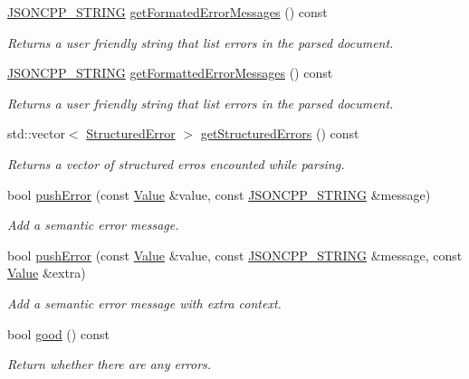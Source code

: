 \begin{DoxyCompactItemize}
\hyperlink{json_8h_a1e723f95759de062585bc4a8fd3fa4be}{J\+S\+O\+N\+C\+P\+P\+\_\+\+S\+T\+R\+I\+NG} \hyperlink{class_json_1_1_reader_a791cbc5afd1bef1631e07239dc452c79}{get\+Formated\+Error\+Messages} () const
\begin{DoxyCompactList}\small\item\em Returns a user friendly string that list errors in the parsed document. \end{DoxyCompactList}\item 
\hyperlink{json_8h_a1e723f95759de062585bc4a8fd3fa4be}{J\+S\+O\+N\+C\+P\+P\+\_\+\+S\+T\+R\+I\+NG} \hyperlink{class_json_1_1_reader_ae638a7b1f36f7ccf99ba89fa36ccf222}{get\+Formatted\+Error\+Messages} () const
\begin{DoxyCompactList}\small\item\em Returns a user friendly string that list errors in the parsed document. \end{DoxyCompactList}\item 
std\+::vector$<$ \hyperlink{struct_json_1_1_reader_1_1_structured_error}{Structured\+Error} $>$ \hyperlink{class_json_1_1_reader_ae3d714e95bd98b27e296c607e408189b}{get\+Structured\+Errors} () const
\begin{DoxyCompactList}\small\item\em Returns a vector of structured erros encounted while parsing. \end{DoxyCompactList}\item 
bool \hyperlink{class_json_1_1_reader_af5fa7099083f01706635ade1d0f8ddb5}{push\+Error} (const \hyperlink{class_json_1_1_value}{Value} \&value, const \hyperlink{json_8h_a1e723f95759de062585bc4a8fd3fa4be}{J\+S\+O\+N\+C\+P\+P\+\_\+\+S\+T\+R\+I\+NG} \&message)
\begin{DoxyCompactList}\small\item\em Add a semantic error message. \end{DoxyCompactList}\item 
bool \hyperlink{class_json_1_1_reader_a3568be9db568ff57bd3fcc373143dff3}{push\+Error} (const \hyperlink{class_json_1_1_value}{Value} \&value, const \hyperlink{json_8h_a1e723f95759de062585bc4a8fd3fa4be}{J\+S\+O\+N\+C\+P\+P\+\_\+\+S\+T\+R\+I\+NG} \&message, const \hyperlink{class_json_1_1_value}{Value} \&extra)
\begin{DoxyCompactList}\small\item\em Add a semantic error message with extra context. \end{DoxyCompactList}\item 
bool \hyperlink{class_json_1_1_reader_a86cbb42b3e6d4a4d6416473b1a8f6ae7}{good} () const
\begin{DoxyCompactList}\small\item\em Return whether there are any errors. \end{DoxyCompactList}\end{DoxyCompactItemize}
